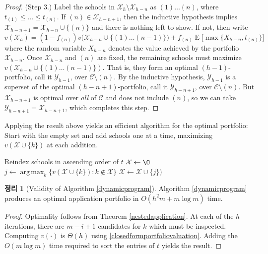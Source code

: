 \documentclass[12pt]{article} %
\DeclareMathOperator*{\argmax}{arg\,max}
\newtheorem{theorem}{Theorem}
\theoremstyle{definition}
\newtheorem{theorem}{정리}
\theoremstyle{definition}
\begin{document}
\begin{proof}
(Step 3.) Label the schools in $\mathcal{X}_h \setminus \mathcal{X}_{h-n}$  as $(1) \dots (n)$, where $t_{(1)} \leq \dots \leq t_{(n)}$. If $(n) \in  \mathcal{X}_{h-n+1}$, then the inductive hypothesis implies $\mathcal{X}_{h-n+1} = \mathcal{X}_{h-n} \cup \{(n)\}$ and there is nothing left to show. If not, then write 
\begin{equation}
v(\mathcal{X}_h) = (1 - f_{(n)}) v\bigl( \mathcal{X}_{h-n}\cup\{(1) \dots (n-1)\}\bigr) + f_{(n)} \operatorname{E}\bigl[\max\{X_{h-n}, t_{(n)}\}\bigr]
\end{equation}
where the random variable $X_{h-n}$ denotes the value achieved by the portfolio $\mathcal{X}_{h-n}$. Once $ \mathcal{X}_{h-n}$ and $(n)$ are fixed, the remaining schools must maximize $v(\mathcal{X}_{h-n}\cup\{(1) \dots (n-1)\})$. That is, they form an optimal $(h-1)$-portfolio, call it $\mathcal{Y}_{h-1}$, over $\mathcal{C}\setminus (n)$. By the inductive hypothesis, $\mathcal{Y}_{h-1}$ is a superset of the optimal $(h-n+1)$-portfolio, call it $\mathcal{Y}_{h-n+1}$, over $\mathcal{C}\setminus (n)$. But $\mathcal{X}_{h-n+1}$ is optimal over \emph{all} of $\mathcal{C}$ and does not include $(n)$, so we can take $\mathcal{Y}_{h-n+1} = \mathcal{X}_{h-n+1} $, which completes this step.
\end{proof}

Applying the result above yields an efficient algorithm for the optimal portfolio: Start with the empty set and add schools one at a time, maximizing $v(\mathcal{X}\cup \{k\})$ at each addition. 

\begin{algorithm}[H] 
\caption{Dynamic programming algorithm for Alma’s problem.} \label{dynamicprogram}
\KwData{Utility values $t \in[0, \infty)^m$, admissions probabilities $f \in [0, 1]^m$.}
Reindex schools in ascending order of $t$\;
$\mathcal{X} \gets \O$\;
{
    $j \gets \argmax_k\bigl\{v(\mathcal{X}\cup\{k\}) : k \notin \mathcal{X}\bigr\}$\;
    $\mathcal{X} \gets \mathcal{X}\cup\{j\})$ \;
}
\end{algorithm}

\begin{theorem}[Validity of Algorithm \ref{dynamicprogram}]
Algorithm \ref{dynamicprogram} produces an optimal application portfolio in $O(h^2 m + m \log m)$ time.
\end{theorem}
\begin{proof}
Optimality follows from Theorem \ref{nestedapplication}. At each of the $h$ iterations, there are $m - i +1$ candidates for $k$ which must be inspected. Computing $v(\cdot)$ is $\Theta(h)$ using \eqref{closedformportfoliovaluation}. Adding the $O(m\log m)$ time required to sort the entries of $t$ yields the result.
\end{proof}
\end{document}
